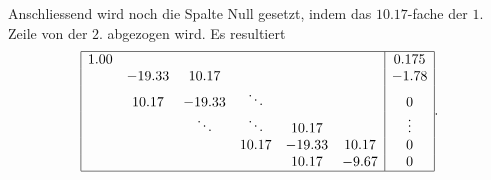 Anschliessend wird noch die Spalte Null gesetzt, indem das $ 10.17 $-fache der $1$. Zeile von der $2$. abgezogen wird.
Es resultiert
\begin{equation}
    \begin{array}{|cccccc|c|}
        \hline
         1.00  &        &        &        &        &        & 0.175  \\
               &-19.33  & 10.17  &        &        &        & -1.78  \\
               & 10.17  &-19.33  & \ddots &        &        & 0      \\
               &        & \ddots & \ddots & 10.17  &        & \vdots \\
               &        &        & 10.17  &-19.33  & 10.17  & 0      \\
               &        &        &        & 10.17  & -9.67  & 0      \\
        \hline
    \end{array}.
\end{equation}

